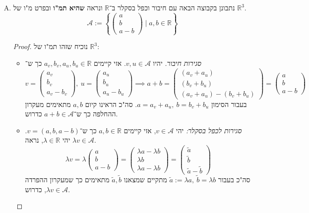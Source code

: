 \documentclass[]{article}
\newcommand\R     {\mathbb{R}}
\newcommand\ac    {\mathcal{A}}
\newcommand\F         {\mathbb{F}}
\newcommand\pms[1]    {\begin{pmatrix}
		#1
\end{pmatrix}}
\renewcommand\lg      {\lambda}
\newcommand\tl    {\tilde}
\newcommand\ccb[1]    {\left \{ #1 \right \}}
\theoremstyle{definition}
\begin{document}
\begin{enumerate}[(A)]
\begin{proof}
\begin{itemize}
				\begin{alignat*}{9}
					(\lg f)'(17) &= (\lg f)^{(1)}(17) &= \lg f^{(1)}(17) &= \lg \cdot 0 = 0 \\
					(\lg f)''(17) &= (\lg f)^{(2)}(17) &= \lg f^{(2)}(17) &= \lg \cdot 0 = 0 \\
					(\lg f)'''(17) &= (\lg f)^{(3)}(17) &= \lg f^{(3)}(17) &= \lg \cdot 0 = 0 
				\end{alignat*}
				כלומר $\lg f \in \F$ כדרוש. 
				\item \textit{קיום איבר 0: }מסגירות לכפל. 
			\end{itemize}
			סה"כ $\F$ תמ"ו של $\R \to \R$ ולכן הוא מ"ו כדרוש. 
		\end{proof}
		\item נתבונן בקבוצה הבאה עם חיבור וכפל בסקלר ב־$\R$ ונראה \textbf{שהיא תמ"ו} ובפרט מ"ו של $\R^3$. 
		\[ \ac := \ccb{\pms{a \\ b \\ a - b} \mid a, b \in \R} \]
		\begin{proof}
			נוכיח שזהו תמ"ו של $\R^3$: 
			\begin{itemize}
				\item \textit{סגירות חיבור. }יהיו $v, u \in \ac$. אזי קיימים $a_v, b_v, a_u, b_u \in \R$ כך ש־
				\[ v = \pms{a_v \\ b_v \\ a_v - b_v}, \ u = \pms{a_u \\ b_u \\ a_u - b_u} \implies a + b = \pms{(a_v + a_u) \\ (b_v + b_u) \\ (a_v + a_u) - (b_v + b_u)} = \pms{a \\ b \\ a - b} \]
				בעבור הסימון $a = a_v + a_u, \ b = b_v + b_u$. סה"כ הראינו קיום $a, b$ מתאימים מעקרון ההחלפה כך ש־$a + b \in \ac$ כדרוש. 
				\item \textit{סגירות לכפל בסקלר: }יהי $v \in \ac$, אזי קיימים $a, b \in \R$ כך ש־$v = (a, b, a - b)$. יהי $\lg \in \R$, נראה $\lg v \in \ac$. 
				\[ \lg v = \lg \pms{a \\ b \\ a - b}  = \pms{\lg a - \lg b \\ \lg b \\ \lg a - \lg b} = \pms{\tl a \\ \tl b \\ \tl a - \tl b} \]
				סה"כ בעבור $\tl a := \lg a, \ \tl b = \lg b$ מתקיים שמצאנו $\tl a, \tl b$ מתאימים כך שמעקרון ההפרדה $\lg v \in \ac$, כדרוש. 

\end{itemize}
\end{proof}
\end{enumerate}
\end{document}
